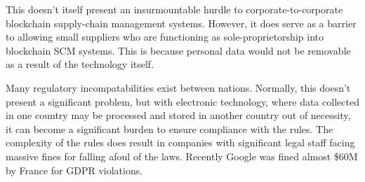 This doesn't itself present an insurmountable hurdle to corporate-to-corporate blockchain supply-chain management systems. However, it does serve as a barrier to allowing small suppliers who are functioning as sole-proprietorship into blockchain SCM systems. This is because personal data would not be removable as a result of the technology itself.

Many regulatory incompatabilities exist between nations. Normally, this doesn't present a significant problem, but with electronic technology, where data collected in one country may be processed and stored in another country out of necessity, it can become a significant burden to ensure compliance with the rules. The complexity of the rules does result in companies with significant legal staff facing massive fines for falling afoul of the laws. Recently Google was fined almost \$60M by France for GDPR violations.

